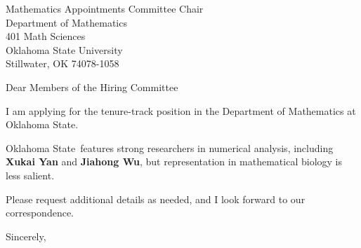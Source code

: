 




	
	
	\def\School{Oklahoma State}
	
	\begin{letter}
		{Mathematics Appointments Committee Chair\\
			Department of Mathematics\\
			401 Math Sciences\\
			Oklahoma State University\\
			Stillwater, OK 74078-1058
		}
		
		\opening{Dear Members of the Hiring Committee}
		
		
		I am applying for the tenure-track position in the Department of Mathematics at \School. 
		
		
		
		\School~features strong researchers in numerical analysis, including \textbf{Xukai Yan
		} and \textbf{Jiahong Wu}, but representation in mathematical biology is less salient. 
		
		
		
		
		
		Please request additional details as needed, and I look forward to our correspondence.
		
		\closing{Sincerely,}
	\end{letter}

